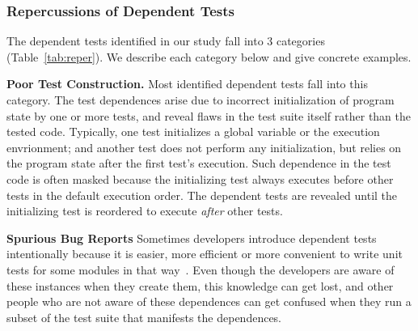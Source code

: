 \subsubsection{Repercussions of Dependent Tests}
\label{sec:repercussion}



The dependent tests identified in our study fall into 3
categories (Table~\ref{tab:reper}). We describe each category below and give
concrete examples. 

\vspace{1mm}

\noindent \textbf{Poor Test Construction.} Most identified
dependent tests fall into this category. The test dependences
arise due to incorrect initialization of program state by one
or more tests, and reveal flaws in the test suite itself
rather than the tested code. Typically, one test initializes
a global variable or the execution envrionment; and another
test does not perform any initialization, but
relies on the program state after the first test's execution.
Such dependence in the test code is often masked because
the initializing test always executes before other tests in the
default execution order. The dependent tests are revealed
until the initializing test is reordered to execute
\textit{after} other tests. 


\vspace{1mm}

\noindent \textbf{Spurious Bug Reports}
Sometimes developers introduce dependent tests intentionally because it is
easier, more efficient or more convenient to write unit tests for some modules
in that way~\cite{kapfhammeretal:FSE:2003, whittakeretal:2012}.
Even though the developers are aware of these instances
when they create them, this knowledge can get lost, 
and other people who are not aware of these dependences can get confused 
when they run a subset of the test suite that manifests the
dependences.

